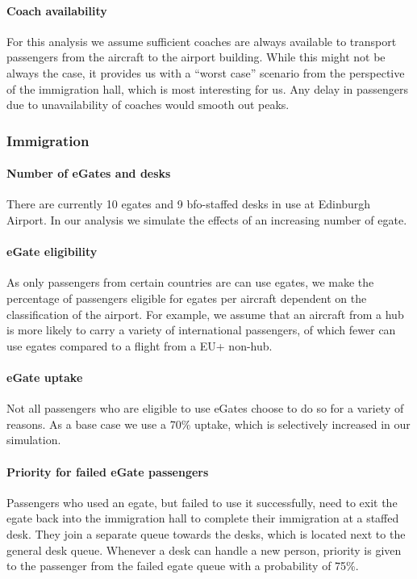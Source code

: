 \documentclass[10pt]{article}
\begin{document}
\paragraph{Coach availability}
For this analysis we assume sufficient coaches are always available to transport passengers from the aircraft to the airport building. While this might not be always the case, it provides us with a ``worst case'' scenario from the perspective of the immigration hall, which is most interesting for us. Any delay in passengers due to unavailability of coaches would smooth out peaks.

\subsubsection{Immigration} \label{subsec:choices_immigration}

\paragraph{Number of eGates and desks} There are currently 10 \glspl{egate} and 9 \gls{bfo}-staffed desks in use at Edinburgh Airport. In our analysis we simulate the effects of an increasing number of \gls{egate}.



\paragraph{eGate eligibility} 
As only passengers from certain countries are can use \glspl{egate}, we make the percentage of passengers eligible for \glspl{egate} per aircraft dependent on the classification of the airport. For example, we assume that an aircraft from a hub is more likely to carry a variety of international passengers, of which fewer can use \glspl{egate} compared to a flight from a EU+ non-hub. 

\paragraph{eGate uptake} 
Not all passengers who are eligible to use eGates choose to do so for a variety of reasons. As a base case we use a 70\% uptake, which is selectively increased in our simulation. 


\paragraph{Priority for failed eGate passengers}
Passengers who used an \gls{egate}, but failed to use it successfully, need to exit the \gls{egate} back into the immigration hall to complete their immigration at a staffed desk. They join a separate queue towards the desks, which is located next to the general desk queue. Whenever a desk can handle a new person, priority is given to the passenger from the failed \gls{egate} queue with a probability of 75\%.
\end{document}
